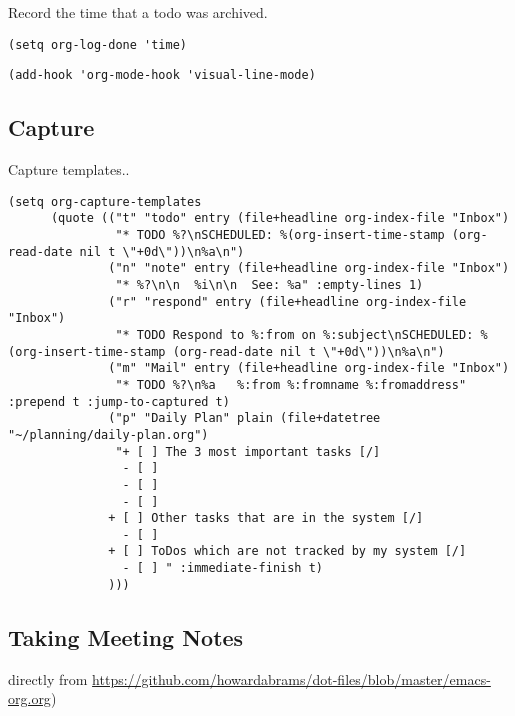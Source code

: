 \documentclass[12pt]{article}
\begin{document}
Record the time that a todo was archived.

\begin{verbatim}
(setq org-log-done 'time)
\end{verbatim}

\begin{verbatim}
(add-hook 'org-mode-hook 'visual-line-mode)
\end{verbatim}
\subsection{Capture}
\label{sec:orgbb5c883}
Capture templates..
\begin{verbatim}
(setq org-capture-templates
      (quote (("t" "todo" entry (file+headline org-index-file "Inbox")
               "* TODO %?\nSCHEDULED: %(org-insert-time-stamp (org-read-date nil t \"+0d\"))\n%a\n")
              ("n" "note" entry (file+headline org-index-file "Inbox")
               "* %?\n\n  %i\n\n  See: %a" :empty-lines 1)
              ("r" "respond" entry (file+headline org-index-file "Inbox")
               "* TODO Respond to %:from on %:subject\nSCHEDULED: %(org-insert-time-stamp (org-read-date nil t \"+0d\"))\n%a\n")
              ("m" "Mail" entry (file+headline org-index-file "Inbox")
               "* TODO %?\n%a   %:from %:fromname %:fromaddress" :prepend t :jump-to-captured t)
              ("p" "Daily Plan" plain (file+datetree "~/planning/daily-plan.org")
               "+ [ ] The 3 most important tasks [/]
                - [ ] 
                - [ ] 
                - [ ] 
              + [ ] Other tasks that are in the system [/]
                - [ ] 
              + [ ] ToDos which are not tracked by my system [/]
                - [ ] " :immediate-finish t)
              )))
\end{verbatim}

\subsection{Taking Meeting Notes}
\label{sec:org6ec902f}

directly from \url{https://github.com/howardabrams/dot-files/blob/master/emacs-org.org})
\end{document}
